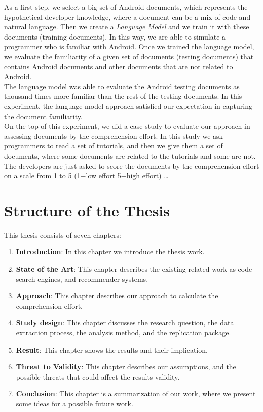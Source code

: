\documentclass[12pt,mscthesis]{usiinfthesis}
\begin{document}
	 As a first step, we select a big set of Android documents, which represents the hypothetical developer knowledge, where a document can be a mix of code and natural language. Then we create a \emph{ Language Model} \cite{Hindle:2012:NS:2337223.2337322} and we train it with these documents (training documents). In this way, we are able to simulate a programmer who is familiar with Android. Once we trained the language model, we evaluate the familiarity of a given set of documents (testing documents) that contains Android documents and other documents that are not related to Android.\\ 
	 The language model was able to evaluate the Android testing documents as thousand times more familiar than the rest of the testing documents.
	 In this experiment, the language model approach satisfied our expectation in capturing the document familiarity.\\

	 On the top of this experiment, we did a case study to evaluate our approach in assessing documents by the comprehension effort. In this study we ask programmers to read a set of tutorials, and then we give them a set of documents, where some documents are related to the tutorials and some are not.
	 \newpage
	 The developers are just asked to score the documents by the comprehension effort on a scale from 1 to 5 (1$-$low effort 5$-$high effort)
	 \dots 
	

	\section{Structure of the Thesis}
	This thesis consists of seven chapters: 
	\begin{enumerate}
	
		\item \textbf{Introduction}: In this chapter we introduce the thesis work.
		\item \textbf{State of the Art}: This chapter describes the existing related work as code search engines, and recommender systems.
		\item \textbf{Approach}: This chapter describes our approach to calculate the comprehension effort.
		\item \textbf{Study design}: This chapter discusses the research question, the data extraction process, the analysis method, and the replication package.
		\item \textbf{Result}: This chapter shows the results and their implication.
		\item \textbf{Threat to Validity}: This chapter describes our assumptions, and the possible threats that could affect the results validity.
		\item \textbf{Conclusion}: This chapter is a summarization of our work, where we present some ideas for a possible future work.
	\end{enumerate}
\end{document}
